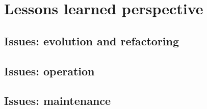 \section{Lessons learned perspective} \label{section:Lessons learned perspective}
\subsection{Issues: evolution and refactoring}
\subsection{Issues: operation}
\subsection{Issues: maintenance}